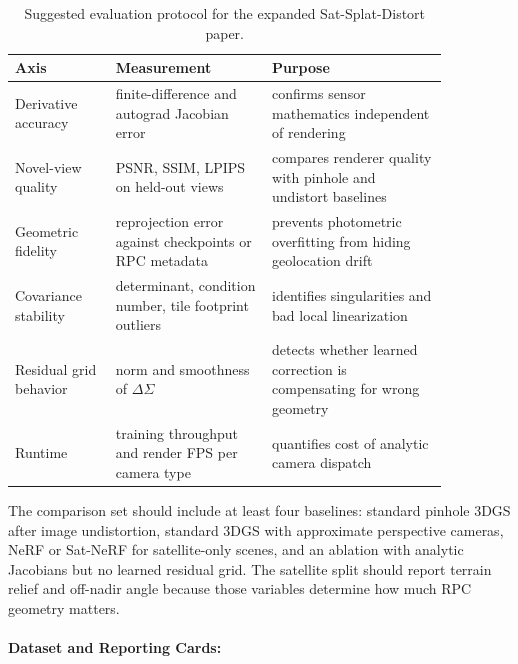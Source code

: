\documentclass{article}
\begin{document}
\begin{table}[t]
\centering
\caption{Suggested evaluation protocol for the expanded Sat-Splat-Distort paper.}
\label{tab:protocol}
\begin{tabular}{@{}p{0.20\linewidth}p{0.31\linewidth}p{0.35\linewidth}@{}}
\toprule
\textbf{Axis} & \textbf{Measurement} & \textbf{Purpose}\\
\midrule
Derivative accuracy & finite-difference and autograd Jacobian error & confirms sensor mathematics independent of rendering\\
Novel-view quality & PSNR, SSIM, LPIPS on held-out views & compares renderer quality with pinhole and undistort baselines\\
Geometric fidelity & reprojection error against checkpoints or RPC metadata & prevents photometric overfitting from hiding geolocation drift\\
Covariance stability & determinant, condition number, tile footprint outliers & identifies singularities and bad local linearization\\
Residual grid behavior & norm and smoothness of $\Delta\Sigma$ & detects whether learned correction is compensating for wrong geometry\\
Runtime & training throughput and render FPS per camera type & quantifies cost of analytic camera dispatch\\
\bottomrule
\end{tabular}
\end{table}

The comparison set should include at least four baselines: standard pinhole 3DGS after image undistortion, standard 3DGS with approximate perspective cameras, NeRF or Sat-NeRF for satellite-only scenes, and an ablation with analytic Jacobians but no learned residual grid. The satellite split should report terrain relief and off-nadir angle because those variables determine how much RPC geometry matters.

\paragraph{Dataset and Reporting Cards:}
\end{document}
